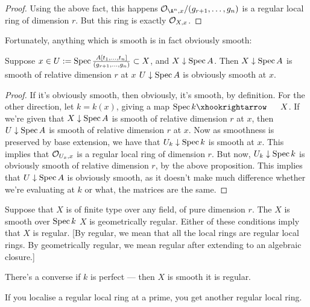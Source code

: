 \documentclass[11pt]{article}
\begin{document}
\begin{Oct27}
\begin{proof}
Using the above fact, this happens \Iff $\calO_{\A^n,x}/(g_{r+1},\ldots,g_n)$ is a regular local ring of dimension $r$. But this ring is exactly $\mathcal{O}_{X,x}$.
\end{proof}
Fortunately, anything which is smooth is in fact obviously smooth:
\begin{prop*}
Suppose $x\in U:=\operatorname{Spec}\frac{A[t_1,\ldots,t_n]}{(g_{r+1},\ldots,g_n)}\subset X$, and $X\downarrow\operatorname{Spec} A$.
Then $X\downarrow \operatorname{Spec} A$ is smooth of relative dimension $r$ at $x$ \Iff $U\downarrow\operatorname{Spec} A$ is obviously smooth at $x$.
\end{prop*}
\begin{proof}
If it's obviously smooth, then obviously, it's smooth, by definition. For the other direction, let $k=k(x)$, giving a map $\spec k\cofibration X$. If we're given that $X\downarrow \operatorname{Spec} A$ is smooth of relative dimension $r$ at $x$, then $U\downarrow\operatorname{Spec} A$ is smooth of relative dimension $r$ at $x$. Now as smoothness is preserved by base extension, we have that $U_k\downarrow \operatorname{Spec} k$ is smooth at $x$. This implies that $\mathcal{O}_{U_x,x}$ is a regular local ring of dimension $r$. But now, $U_k\downarrow \operatorname{Spec} k$ is obviously smooth of relative dimension $r$, by the above proposition. This implies that $U\downarrow\operatorname{Spec} A$ is obviously smooth, as it doesn't make much difference whether we're evaluating at $k$ or what, the matrices are the same.
\end{proof}
\begin{fact*}
Suppose that $X$ is of finite type over any field, of pure dimension $r$. The $X$ is smooth over $\operatorname{Spec} k$ \Iff $X$ is geometrically regular. Either of these conditions imply that $X$ is regular. [By regular, we mean that all the local rings are regular local rings. By geometrically regular, we mean regular after extending to an algebraic closure.]

There's a converse if $k$ is perfect --- then $X$ is smooth \Iff it is regular.
\end{fact*}
\begin{fact*}
If you localise a regular local ring at a prime, you get another regular local ring.
\end{fact*}


\end{Oct27}
\end{document}
